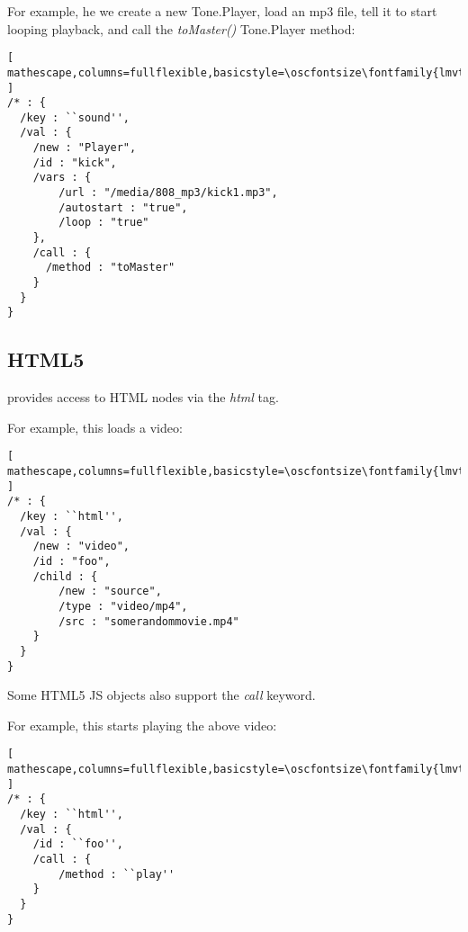 For example, he we create a new Tone.Player, load an mp3 file, tell it to start looping playback, and call the \textit{toMaster()} Tone.Player method:

\begin{minipage}{\linewidth}
\begin{lstlisting}[ mathescape,columns=fullflexible,basicstyle=\oscfontsize\fontfamily{lmvtt}\selectfont ]
/* : {
  /key : ``sound'',
  /val : {
    /new : "Player",
    /id : "kick",
    /vars : {
        /url : "/media/808_mp3/kick1.mp3",
        /autostart : "true",
        /loop : "true"
    },
    /call : {
      /method : "toMaster"
    }
  }
}
\end{lstlisting}
\end{minipage}

\subsection{HTML5}\label{sec:html}
\drawsocket provides access to HTML nodes via the \textit{html} tag. 

For example, this loads a video:

\begin{lstlisting}[ mathescape,columns=fullflexible,basicstyle=\oscfontsize\fontfamily{lmvtt}\selectfont ]
/* : {
  /key : ``html'',
  /val : {
    /new : "video",
    /id : "foo",
    /child : {
        /new : "source",
        /type : "video/mp4",
        /src : "somerandommovie.mp4"
    }
  }
}
\end{lstlisting}

Some HTML5 JS objects also support the \textit{call} keyword.

For example, this starts playing the above video:

\begin{lstlisting}[ mathescape,columns=fullflexible,basicstyle=\oscfontsize\fontfamily{lmvtt}\selectfont ]
/* : {
  /key : ``html'',
  /val : {
    /id : ``foo'',
    /call : {
        /method : ``play''
    }
  }
}
\end{lstlisting}


